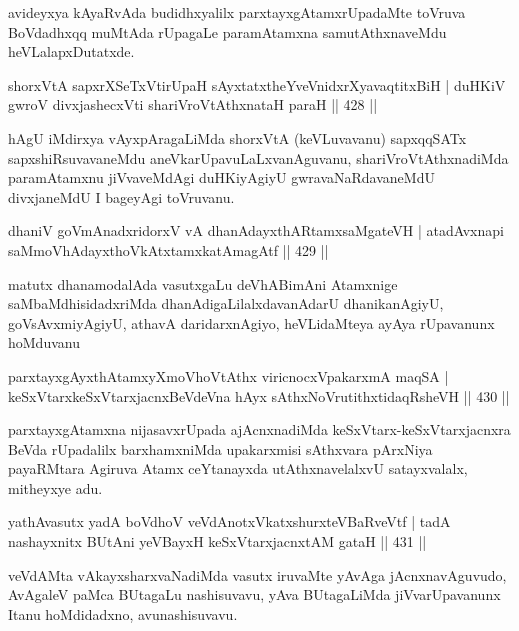 \begin{artha}
avideyxya kAyaRvAda budidhxyalilx parxtayxgAtamxrUpadaMte toVruva BoVdadhxqq muMtAda rUpagaLe paramAtamxna samutAthxnaveMdu heVLalapxDutatxde.
\end{artha}

\begin{shl}
shorxVtA sapxrXSeTxVtirUpaH sAyxtatxtheYveVnidxrXyavaqtitxBiH |
duHKiV gwroV divxjashecxVti shariVroVtAthxnataH paraH \hfill  || 428 ||
\end{shl}

\begin{artha}
hAgU iMdirxya vAyxpAragaLiMda shorxVtA (keVLuvavanu) sapxqqSATx sapxshiRsuva\-vaneMdu aneVkarUpavuLaLxvanAguvanu, shariVroVtAthxnadiMda paramAtamxnu jiVva\-veMdAgi duHKiyAgiyU gwravaNaRdavaneMdU divxjaneMdU I bageyAgi toVruvanu.
\end{artha}

\begin{shl}
dhaniV goVmAnadxridorxV vA dhanAdayxthARtamxsaMgateVH |
atadAvxnapi saMmoVhAdayxthoVkAtxtamxkatAmagAtf \hfill  || 429 ||
\end{shl}

\begin{artha}
matutx dhanamodalAda vasutxgaLu deVhABimAni Atamxnige
saMbaMdhisidadxriMda dhanAdigaLilalxdavanAdarU dhanikanAgiyU,
goVsAvxmiyAgiyU, athavA daridarx\-nAgiyo, heVLidaMteya ayAya rUpavanunx
hoMduvanu
\end{artha}


\begin{shl}
parxtayxgAyxthAtamxyXmoVhoVtAthx viricnocxVpakarxmA maqSA |
keSxVtarxkeSxVtarxjacnxBeVdeVna hAyx sAthxNoVrutithxtidaqRsheVH \hfill  || 430 ||
\end{shl}

\begin{artha}
parxtayxgAtamxna nijasavxrUpada ajAcnxnadiMda keSxVtarx-keSxVtarxjacnxra BeVda rUpadalilx barxhamxniMda upakarxmisi sAthxvara pArxNiya payaRMtara Agiruva Atamx ceYtanayxda utAthxnavelalxvU satayxvalalx, mitheyxye adu.
\end{artha}

\begin{shl}
yathAvasutx yadA boVdhoV veVdAnotxVkatxshurxteVBaRveVtf |
tadA nashayxnitx BUtAni yeVBayxH keSxVtarxjacnxtAM gataH \hfill  || 431 ||
\end{shl}

\begin{artha}
veVdAMta vAkayxsharxvaNadiMda vasutx iruvaMte yAvAga jAcnxnavAguvudo, AvAgaleV paMca BUtagaLu nashisuvavu, yAva BUtagaLiMda jiVvarUpavanunx Itanu hoMdidadxno, avunashisuvavu.
\end{artha}

